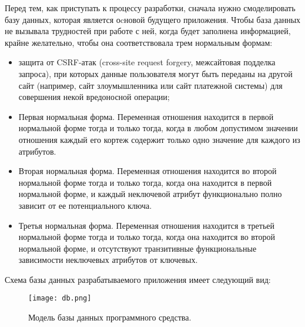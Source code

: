 Перед тем, как приступать к процессу разработки, сначала нужно смоделировать базу данных, которая является оcновой будущего приложения. Чтобы база данных не вызывала трудностей при работе с ней, когда будет заполнена информацией, крайне желательно, чтобы она соответствовала трем нормальным формам:
\begin{itemize}
  \item защита от CSRF-атак (cross-site request forgery, межсайтовая подделка запроса), при которых данные пользователя могут быть переданы на другой сайт (например, сайт злоумышленника или сайт платежной системы) для совершения некой вредоносной операции;
  \item Первая нормальная форма. Переменная отношения находится в первой нормальной форме тогда и только тогда, когда в любом допустимом значении отношения каждый его кортеж содержит только одно значение для каждого из атрибутов. 
  \item Вторая нормальная форма. Переменная отношения находится во второй нормальной форме тогда и только тогда, когда она находится в первой нормальной форме, и каждый неключевой атрибут функционально полно зависит от ее потенциального ключа.
  \item Третья нормальная форма. Переменная отношения находится в третьей нормальной форме тогда и только тогда, когда она находится во второй нормальной форме, и отсутствуют транзитивные функциональные зависимости неключевых атрибутов от ключевых.
\end{itemize}

Схема базы данных разрабатываемого приложения имеет следующий вид:
\begin{figure}[ht]
\centering
  \texttt{[image: db.png]}  
  \caption{ Модель базы данных программного средства. }
  \label{fig:domain:manual_structure:credit_db}
\end{figure}